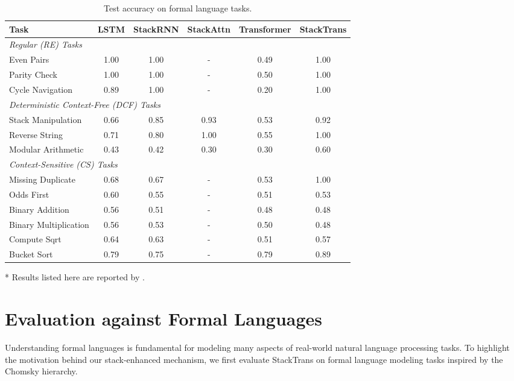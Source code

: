 \documentclass{article}
\DeclareRobustCommand{\method}{{\sc StackTrans}\xspace}
\begin{document}
\begin{table}[t]
\centering
\caption{Test accuracy on formal language tasks.}
\label{tab:formallang_results}
\begin{threeparttable}
\begin{tabular}{lccccc}
\toprule
Task & LSTM & StackRNN & StackAttn\tnote{*} & Transformer & \method \\
\midrule
\multicolumn{3}{l}{\textit{Regular (RE) Tasks}} \\
Even Pairs  & 1.00 & 1.00 & - & 0.49 & 1.00  \\
Parity Check  & 1.00 & 1.00 & - & 0.50 & 1.00  \\
Cycle Navigation & 0.89 & 1.00 & - & 0.20 & 1.00 \\
\midrule
\multicolumn{3}{l}{\textit{Deterministic Context-Free (DCF) Tasks}} \\
Stack Manipulation & 0.66 & 0.85 & 0.93 & 0.53 & 0.92  \\
Reverse String  & 0.71 & 0.80 & 1.00 & 0.55 & 1.00  \\
Modular Arithmetic  & 0.43 & 0.42 & 0.30 & 0.30 & 0.60  \\
\midrule
\multicolumn{3}{l}{\textit{Context-Sensitive (CS) Tasks}} \\
Missing Duplicate  & 0.68 & 0.67 & - & 0.53  & 1.00  \\
Odds First & 0.60 & 0.55 & - & 0.51 & 0.53  \\
Binary Addition  & 0.56 & 0.51 & - & 0.48 & 0.48  \\
Binary Multiplication  & 0.56 & 0.53 & - & 0.50 & 0.48  \\
Compute Sqrt & 0.64 & 0.63 & - & 0.51 & 0.57  \\
Bucket Sort & 0.79 & 0.75 & - & 0.79 & 0.89  \\
\bottomrule
\end{tabular}

\begin{tablenotes}\footnotesize
\begin{minipage}[t]{\textwidth}
    \item [*] Results listed here are reported by \cite{dusell2024stack}.
\end{minipage}
\end{tablenotes}
\end{threeparttable}
\vspace{-12pt}
\end{table}

\section{Evaluation against Formal Languages}
Understanding formal languages is fundamental for modeling many aspects of real-world natural language processing tasks. To highlight the motivation behind our stack-enhanced mechanism, we first evaluate \method on formal language modeling tasks inspired by the Chomsky hierarchy.
\end{document}
